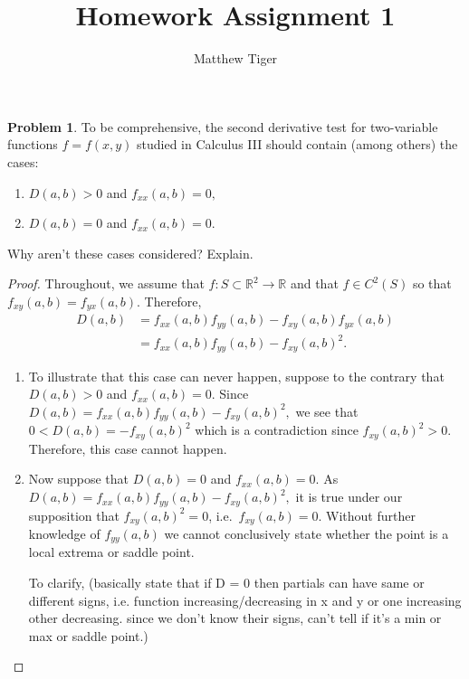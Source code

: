 \documentclass[12pt]{article}
\title{Homework Assignment 1}
\author{Matthew Tiger}
\theoremstyle{definition}
\newtheorem{problem}{Problem}
\begin{document}
\maketitle


\begin{problem}
  To be comprehensive, the second derivative test for two-variable functions $f = f(x, y)$
  studied in Calculus III should contain (among others) the cases:
  \begin{enumerate}
    \item $D(a, b) > 0$ and $f_{xx}(a, b) = 0,$
    \item $D(a, b) = 0$ and $f_{xx}(a, b) = 0.$
  \end{enumerate}
  Why aren't these cases considered? Explain.
\end{problem}

\begin{proof}
  Throughout, we assume that $f: S \subset \mathbb{R}^2 \to \mathbb{R}$ and that $f \in C^2(S)$ so
  that $f_{xy}(a,b) = f_{yx}(a,b)$. Therefore,
  \begin{align*}
    D(a, b)
    &= f_{xx}(a,b) f_{yy}(a,b) - f_{xy}(a,b)f_{yx}(a,b) \\
    &= f_{xx}(a,b) f_{yy}(a,b) - f_{xy}(a,b)^2.
  \end{align*}

  \begin{enumerate}
    \item To illustrate that this case can never happen, suppose to the contrary
      that $D(a, b) > 0$ and $f_{xx}(a, b) = 0.$ Since
      $D(a, b) = f_{xx}(a,b) f_{yy}(a,b) - f_{xy}(a,b)^2,$
      we see that $0 < D(a, b) = - f_{xy}(a,b)^2$ which is a contradiction since
      $f_{xy}(a,b)^2 > 0$. Therefore, this case cannot happen.
    \item Now suppose that $D(a, b) = 0$ and $f_{xx}(a, b) = 0$. As
      $D(a, b) = f_{xx}(a,b) f_{yy}(a,b) - f_{xy}(a,b)^2,$
      it is true under our supposition that $f_{xy}(a,b)^2 = 0$, i.e.\ $f_{xy}(a,b) = 0$.
      Without further knowledge of $f_{yy}(a,b)$ we cannot conclusively state whether the
      point is a local extrema or saddle point.

      To clarify, (basically state that if D = 0 then partials can have same or different signs, i.e. function increasing/decreasing in x and y or
      one increasing other decreasing. since we don't know their signs, can't tell if it's a min or max or saddle point.)
  \end{enumerate}
\end{proof}
\newpage
\end{document}
